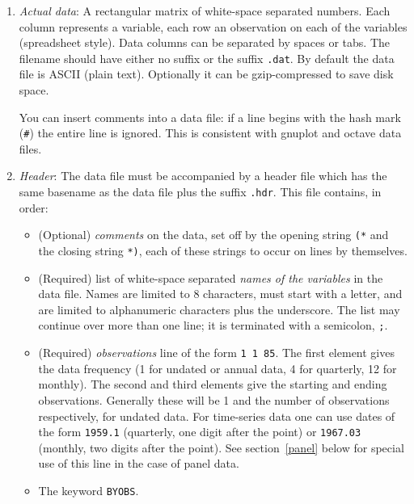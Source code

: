 \documentclass{article}
\begin{document}
\begin{enumerate}
  
\item \textit{Actual data}: A rectangular matrix of white-space
  separated numbers.  Each column represents a variable, each row an
  observation on each of the variables (spreadsheet style). Data
  columns can be separated by spaces or tabs. The filename should have
  either no suffix or the suffix \texttt{.dat}.  By default the data
  file is ASCII (plain text).  Optionally it can be gzip-compressed to
  save disk space.
  
  You can insert comments into a data file: if a line begins with the
  hash mark (\texttt{\#}) the entire line is ignored.  This is
  consistent with gnuplot and octave data files.
  
\item \textit{Header}: The data file must be accompanied by a
  header file which has the same basename as the
  data file plus the suffix \texttt{.hdr}.  This file contains, in
  order:

  \begin{itemize}
  \item (Optional) \textit{comments} on the data, set off by the
    opening string \texttt{(*} and the closing string \texttt{*)},
    each of these strings to occur on lines by themselves.
  \item (Required) list of white-space separated \textit{names of the
      variables} in the data file.  Names are limited to 8 characters,
    must start with a letter, and are limited to alphanumeric
    characters plus the underscore.  The list may continue over more
    than one line; it is terminated with a semicolon, \texttt{;}.
  \item (Required) \textit{observations} line of the form \texttt{1 1
      85}.  The first element gives the data frequency (1 for undated
    or annual data, 4 for quarterly, 12 for monthly).  The second and
    third elements give the starting and ending observations.
    Generally these will be 1 and the number of observations
    respectively, for undated data.  For time-series data one can use
    dates of the form \texttt{1959.1} (quarterly, one digit after the
    point) or \texttt{1967.03} (monthly, two digits after the point).
    See section~\ref{panel} below for special use of this line in the
    case of panel data.
  \item The keyword \texttt{BYOBS}. 
  \end{itemize}
\end{enumerate}
\end{document}
